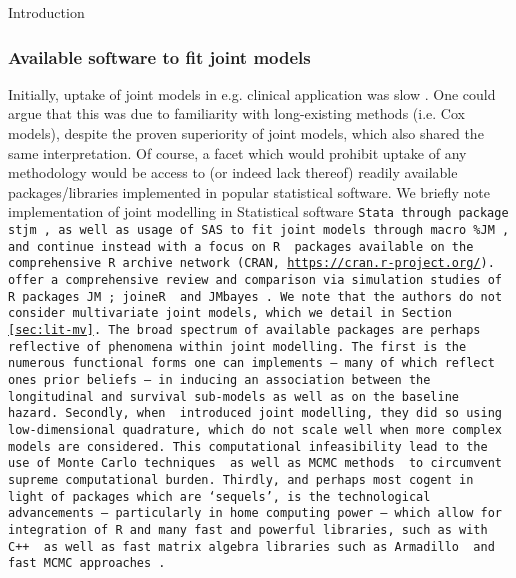 \begin{chapter}{\label{cha:intro}Introduction}
\subsubsection*{\label{sec:lit-software}Available software to fit joint models}
\addtocounter{subsubsection}{1}
  Initially, uptake of joint models in e.g. clinical application was slow \citep{Gould2015}. One could argue that this was due to familiarity with long-existing methods (i.e. Cox models), despite the proven superiority of joint models, which also shared the same interpretation. Of course, a facet which would prohibit uptake of any methodology would be access to (or indeed lack thereof) readily available packages/libraries implemented in popular statistical software. We briefly note implementation of joint modelling in Statistical software \tt{Stata} through package \tt{stjm} \citep{stata-stjm}, as well as usage of \tt{SAS} to fit joint models through macro \tt{\%JM} \citep{SAS-JM}, and continue instead with a focus on \tt{R} \citep{R-R} packages available on the comprehensive R archive network (CRAN, \url{https://cran.r-project.org/}). \citet{Furgal2019} offer a comprehensive review and comparison via simulation studies of \tt{R} packages \tt{JM} \citep{R-JM}; \tt{joineR} \citep{R-joineR} and \tt{JMbayes} \citep{R-JMbayes}. We note that the authors do not consider multivariate joint models, which we detail in Section \ref{sec:lit-mv}. \newline
  The broad spectrum of available packages are perhaps reflective of phenomena within joint modelling. The first is the numerous functional forms one can implements -- many of which reflect ones prior beliefs -- in inducing an association between the longitudinal and survival sub-models as well as on the baseline hazard. Secondly, when \citet{Wulfsohn97} introduced joint modelling, they did so using low-dimensional quadrature, which do not scale well when more complex models are considered. This computational infeasibility lead to the use of Monte Carlo techniques \citep{Henderson2000, Lin2002, Hickey2018} as well as MCMC methods \citep{Rizopoulos2009, PBCapp3} to circumvent supreme computational burden. Thirdly, and perhaps most cogent in light of packages which are `sequels', is the technological advancements -- particularly in home computing power -- which allow for integration of \tt{R} and many fast and powerful libraries, such as with \tt{C++} \citep{R-Rcpp} as well as fast matrix algebra libraries such as Armadillo \citep{R-RcppArmadillo} and fast MCMC approaches \citep{R-stanjm}.

\end{chapter}